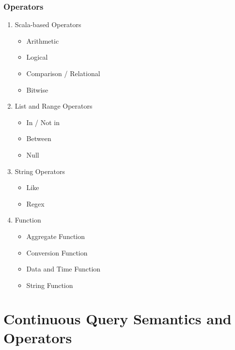 \subsubsection{Operators}
\begin{enumerate}

\item Scala-based Operators
	\begin{itemize}
        \item Arithmetic
        \item Logical
        \item Comparison / Relational
        \item Bitwise
	\end{itemize}
	
 \item List and Range Operators
 	\begin{itemize}
        \item In / Not in
        \item Between
        \item Null
 	\end{itemize}
 \item String Operators
 	\begin{itemize}
        \item Like
        \item Regex
 	\end{itemize}
 \item Function 
 	\begin{itemize}
        \item Aggregate Function
        \item Conversion Function
       	\item Data and Time Function
        \item String Function
 	\end{itemize}

\end{enumerate}


\section{Continuous Query Semantics and Operators} \label{semantic}


